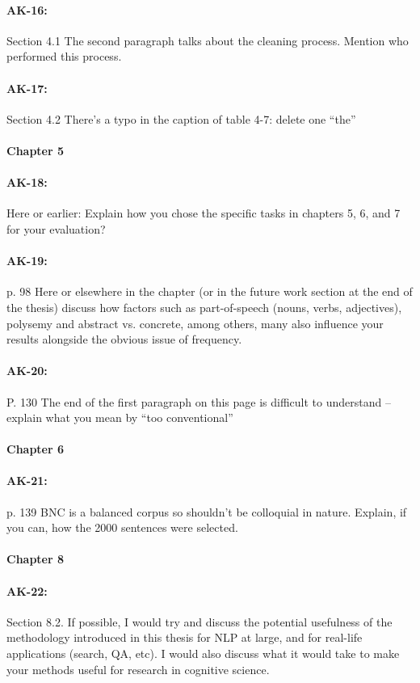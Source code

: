 \documentclass[11pt,a4paper]{article}
\begin{document}
\paragraph{AK-16:} Section 4.1 The second paragraph talks about the cleaning process. Mention who performed this process.

\paragraph{AK-17:} Section 4.2 There’s a typo in the caption of table 4-7: delete one “the”

\paragraph{Chapter 5}

\paragraph{AK-18:} Here or earlier: Explain how you chose the specific tasks in chapters 5, 6, and 7 for your evaluation?

\paragraph{AK-19:} p. 98 Here or elsewhere in the chapter (or in the future work section at the end of the thesis) discuss how factors such as part-of-speech (nouns, verbs, adjectives), polysemy and abstract vs. concrete, among others, many also influence your results alongside the obvious issue of frequency.

\paragraph{AK-20:} P. 130 The end of the first paragraph on this page is difficult to understand – explain what you mean by ``too conventional''

\paragraph{Chapter 6}

\paragraph{AK-21:} p. 139 BNC is a balanced corpus so shouldn’t be colloquial in nature. Explain, if you can, how the 2000 sentences were selected.

\paragraph{Chapter 8}

\paragraph{AK-22:} Section 8.2. If possible, I would try and discuss the potential usefulness of the methodology introduced in this thesis for NLP at large, and for real-life applications (search, QA, etc). I would also discuss what it would take to make your methods useful for research in cognitive science.
\end{document}
